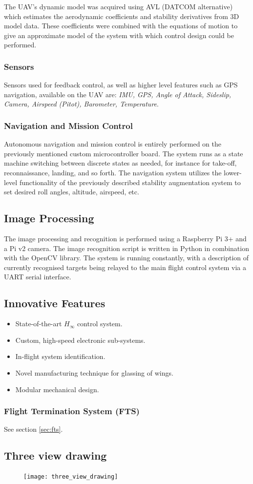 The UAV's dynamic model was acquired using AVL (DATCOM alternative) which estimates the aerodynamic coefficients and stability derivatives from 3D model data. These coefficients were combined with the equations of motion to give an approximate model of the system with which control design could be performed. \\

\subsubsection{Sensors}
Sensors used for feedback control, as well as higher level features such as GPS navigation, available on the UAV are: \textit{IMU, GPS, Angle of Attack, Sideslip, Camera, Airspeed (Pitot), Barometer, Temperature}.

\subsubsection{Navigation and Mission Control}
Autonomous navigation and mission control is entirely performed on the previously mentioned custom microcontroller board. The system runs as a state machine switching between discrete states as needed, for instance for take-off, reconnaissance, landing, and so forth. The navigation system utilizes the lower-level functionality of the previously described stability augmentation system to set desired roll angles, altitude, airspeed, etc.

\subsection{Image Processing}
The image processing and recognition is performed using a Raspberry Pi 3+ and a Pi v2 camera. The image recognition script is written in Python in combination with the OpenCV library. The system is running constantly, with a description of currently recognised targets being relayed to the main flight control system via a UART serial interface.

\subsection{Innovative Features}
\begin{itemize}
	\item State-of-the-art $H_{\infty}$ control system.
	\item Custom, high-speed electronic sub-systems.
	\item In-flight system identification.
	\item Novel manufacturing technique for glassing of wings.
	\item Modular mechanical design.
\end{itemize}

\subsubsection{Flight Termination System (FTS)}
See section \ref{sec:fts}.

\subsection{Three view drawing}
\vspace*{-0.4cm}
\begin{figure}[H]
	\centering
	\texttt{[image: three\_view\_drawing]}
\end{figure}

